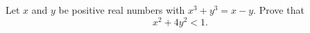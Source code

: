 Let $ x$ and $ y$ be positive real numbers with $ x^3 + y^3 = x - y.$ Prove that \[ x^2 + 4y^2 < 1.\]
